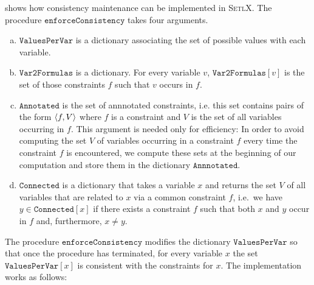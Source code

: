 \noindent
{} shows how consistency maintenance can be implemented in \textsc{SetlX}.
The procedure $\texttt{enforceConsistency}$ takes four arguments.
\begin{enumerate}[(a)]
\item $\texttt{ValuesPerVar}$ is a dictionary associating the set of possible values with each variable.
\item $\texttt{Var2Formulas}$ is a dictionary.  For every variable $v$, $\texttt{Var2Formulas}[v]$ is
      the set of those constraints $f$ such that $v$ occurs in $f$.
\item $\texttt{Annotated}$ is the set of annnotated constraints, i.e. this set contains
      pairs of the form $\pair(f, V)$ where $f$ is a constraint and $V$ is the set of all variables occurring
      in $f$.  This argument is needed only for efficiency: In order to avoid computing the set $V$ of
      variables occurring in a constraint $f$ every time the constraint $f$ is encountered, we compute these
      sets at the beginning of our computation and store them in the dictionary $\texttt{Annnotated}$.
\item $\texttt{Connected}$ is a dictionary that takes a variable $x$ and returns the set $V$ of all variables
      that are related to $x$ via a common constraint $f$, i.e.~we have $y \in \texttt{Connected}[x]$
      if there exists a constraint $f$ such that both $x$ and $y$ occur in $f$ and, furthermore, $x \not= y$.
\end{enumerate}
The procedure $\texttt{enforceConsistency}$ modifies the dictionary $\texttt{ValuesPerVar}$ so that once the
procedure has terminated, for every variable $x$ the set
$\texttt{ValuesPerVar}[x]$ is consistent with the constraints for $x$.  The implementation works as follows:
